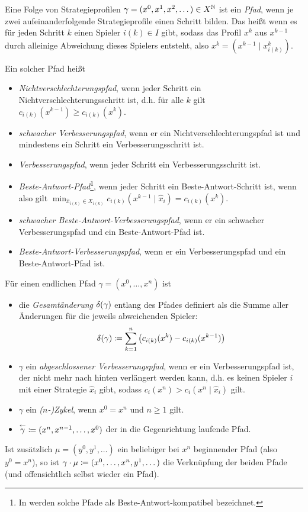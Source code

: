 \begin{defn}\label{defn:Pfade}
	Eine Folge von Strategieprofilen $\gamma = (x^0, x^1, x^2, \dots) \in X^{\mathbb{N}}$ ist ein \emph{Pfad}, wenn je zwei aufeinanderfolgende Strategieprofile einen Schritt bilden. Das heißt wenn es für jeden Schritt $k$ einen Spieler $i(k) \in I$ gibt, sodass das Profil $x^{k}$ aus $x^{k-1}$ durch alleinige Abweichung dieses Spielers entsteht, also $x^{k} = \left(x^{k-1} \mid x^{k}_{i(k)}\right)$.
	
	Ein solcher Pfad heißt
	\begin{itemize}
		\item \emph{Nichtverschlechterungspfad}, wenn jeder Schritt ein Nichtverschlechterungsschritt ist, d.h. für alle $k$ gilt $c_{i(k)}(x^{k-1}) \geq c_{i(k)}(x^{k})$.
		\item \emph{schwacher Verbesserungspfad}, wenn er ein Nichtverschlechterungspfad ist und mindestens ein Schritt ein Verbesserungsschritt ist.
		\item \emph{Verbesserungspfad}, wenn jeder Schritt ein Verbesserungsschritt ist.
		\item \emph{Beste-Antwort-Pfad}\footnote{In \cite{BestRespPot} werden solche Pfade als \glqq Beste-Antwort-kompatibel\grqq{} bezeichnet.}, wenn jeder Schritt ein Beste-Antwort-Schritt ist, wenn also gilt $\min_{\hat{x}_{i(k)} \in X_{i(k)}} c_{i(k)}(x^{k-1} \mid \hat{x}_i) = c_{i(k)}(x^k)$.
		\item \emph{schwacher Beste-Antwort-Verbesserungspfad}, wenn er ein schwacher Verbesserungspfad und ein Beste-Antwort-Pfad ist.
		\item \emph{Beste-Antwort-Verbesserungspfad}, wenn er ein Verbesserungspfad und ein Beste-Antwort-Pfad ist.
	\end{itemize}
\end{defn}

\begin{defn}\label{defn:Pfade2}	
	Für einen endlichen Pfad $\gamma = (x^0, \dots, x^n)$ ist
	\begin{itemize}
		\item die \emph{Gesamtänderung} $\delta(\gamma)$ entlang des Pfades definiert als die Summe aller Änderungen für die jeweils abweichenden Spieler:
		\[\delta(\gamma) \coloneqq \sum_{k=1}^{n} \left(c_{i(k)}(x^k) - c_{i(k)}(x^{k-1})\right) \]
		\item $\gamma$ ein \emph{abgeschlossener Verbesserungspfad}, wenn er ein Verbesserungspfad ist, der nicht mehr nach hinten verlängert werden kann, d.h. es keinen Spieler $i$ mit einer Strategie $\hat{x}_i$ gibt, sodass $c_{i}(x^n) > c_{i}(x^n \mid \hat{x}_i)$ gilt.
		\item $\gamma$ ein \emph{($n$-)Zykel}, wenn $x^0 = x^n$ und $n \geq 1$ gilt.
		\item $\overset{\leftarrow}{\gamma} \coloneqq (x^n, x^{n-1}, \dots, x^0)$ der in die Gegenrichtung laufende Pfad.
	\end{itemize}

	Ist zusätzlich $\mu = (y^0, y^1, \dots)$ ein beliebiger bei $x^n$ beginnender Pfad (also $y^0 = x^n$), so ist $\gamma\cdot\mu \coloneqq (x^0, \dots, x^n, y^1, \dots)$ die Verknüpfung der beiden Pfade (und offensichtlich selbst wieder ein Pfad).
\end{defn}

